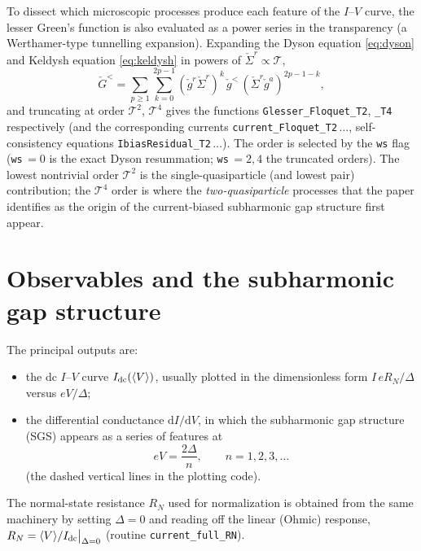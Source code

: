 \documentclass[11pt,a4paper]{article}
\newcommand{\dd}{\mathrm{d}}
\newcommand{\gr}{\check{g}}            %
\newcommand{\Gr}{\check{G}}            %
\newcommand{\Sig}{\check{\Sigma}}      %
\begin{document}
To dissect which microscopic processes produce each feature of the
$I$--$V$ curve, the lesser Green's function is also evaluated as a power series
in the transparency (a Werthamer-type tunnelling expansion).  Expanding the
Dyson equation \eqref{eq:dyson} and Keldysh equation \eqref{eq:keldysh} in
powers of $\Sig^r\propto\mathcal{T}$,
\begin{equation}
  \Gr^< = \sum_{p\ge 1}
  \sum_{k=0}^{2p-1}
  (\gr^r\Sig^r)^{k}\,\gr^<\,(\Sig^r\gr^a)^{2p-1-k},
  \label{eq:pert_expansion}
\end{equation}
and truncating at order $\mathcal{T}^{2}$, $\mathcal{T}^{4}$ gives the functions 
\texttt{Glesser\_Floquet\_T2}, \texttt{\_T4} respectively (and the corresponding
currents \texttt{current\_Floquet\_T2}\,$\ldots$, self-consistency equations
\texttt{IbiasResidual\_T2}\,$\ldots$).  The order is selected by the \texttt{ws} flag
(\texttt{ws}\,$=0$ is the exact Dyson resummation; \texttt{ws}\,$=2,4$ the
truncated orders).  The lowest nontrivial order $\mathcal{T}^2$ is the
single-quasiparticle (and lowest pair) contribution; the $\mathcal{T}^4$
order is where the \emph{two-quasiparticle} processes that the paper identifies
as the origin of the current-biased subharmonic gap structure first appear.

\section{Observables and the subharmonic gap structure}
\label{sec:observables}

The principal outputs are:
\begin{itemize}
  \item the dc $I$--$V$ curve $I_{\rm dc}(\langle V\rangle)$, usually plotted in
        the dimensionless form $I\,e R_N/\Delta$ versus $eV/\Delta$;
  \item the differential conductance $\dd I/\dd V$, in which the subharmonic gap
        structure (SGS) appears as a series of features at
        \begin{equation}
          eV = \frac{2\Delta}{n},\qquad n=1,2,3,\dots
        \end{equation}
        (the dashed vertical lines in the plotting code).
\end{itemize}
The normal-state resistance $R_N$ used for normalization is obtained from the
same machinery by setting $\Delta=0$ and reading off the linear (Ohmic)
response, $R_N = \langle V\rangle / I_{\rm dc}\big|_{\Delta=0}$ (routine
\texttt{current\_full\_RN}).
\end{document}
